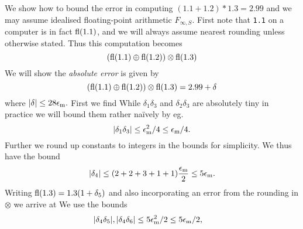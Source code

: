 \begin{example} We show how to bound the error in computing $(1.1 + 1.2) * 1.3 = 2.99$ and we may assume idealised floating-point arithmetic $F_{\ensuremath{\infty},S}$. First note that \texttt{1.1} on a computer is in fact ${\rm fl}(1.1)$, and we will always assume nearest rounding unless otherwise stated. Thus this computation becomes
\[
({\rm fl}(1.1) \ensuremath{\oplus} {\rm fl}(1.2)) \ensuremath{\otimes} {\rm fl}(1.3)
\]
We will show the \emph{absolute error} is given by
\[
({\rm fl}(1.1) \ensuremath{\oplus} {\rm fl}(1.2)) \ensuremath{\otimes} {\rm fl}(1.3) = 2.99 + \ensuremath{\delta}
\]
where $|\ensuremath{\delta}| \ensuremath{\leq}  28 \ensuremath{\epsilon}_{\rm m}.$ First we find
While $\ensuremath{\delta}_1 \ensuremath{\delta}_3$ and $\ensuremath{\delta}_2 \ensuremath{\delta}_3$ are absolutely tiny in practice we will bound them rather naïvely by eg.
\[
|\ensuremath{\delta}_1 \ensuremath{\delta}_3| \ensuremath{\leq} \ensuremath{\epsilon}_{\rm m}^2/4 \ensuremath{\leq} \ensuremath{\epsilon}_{\rm m}/4.
\]
Further we round up constants to integers in the bounds for simplicity. We thus have the bound
\[
|\ensuremath{\delta}_4| \ensuremath{\leq} (2+2+3+1+1) {\ensuremath{\epsilon}_{\rm m} \over 2} \ensuremath{\leq} 5\ensuremath{\epsilon}_{\rm m}.
\]
Writing ${\rm fl}(1.3) = 1.3 (1+\ensuremath{\delta}_5)$ and also incorporating an error from the rounding in $\ensuremath{\otimes}$ we arrive at
We use the bounds
\begin{align*}
|\ensuremath{\delta}_4 \ensuremath{\delta}_5|, |\ensuremath{\delta}_4 \ensuremath{\delta}_6| &\ensuremath{\leq} 5 \ensuremath{\epsilon}_{\rm m}^2/2 \ensuremath{\leq} 5 \ensuremath{\epsilon}_{\rm m}/2,  \cr

\end{align*}
\end{example}
